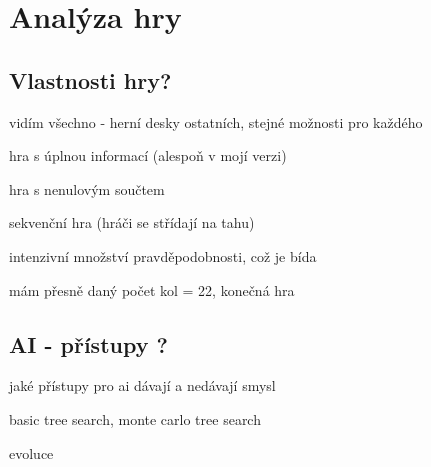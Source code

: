 \chapter{Analýza hry}

\section{Vlastnosti hry?}
vidím všechno - herní desky ostatních, stejné možnosti pro každého

hra s úplnou informací (alespoň v mojí verzi)

hra s nenulovým součtem

sekvenční hra (hráči se střídají na tahu)

intenzivní množství pravděpodobnosti, což je bída

mám přesně daný počet kol = 22, konečná hra


\section{AI - přístupy ?}
jaké přístupy pro ai dávají a nedávají smysl

basic tree search, monte carlo tree search

evoluce

